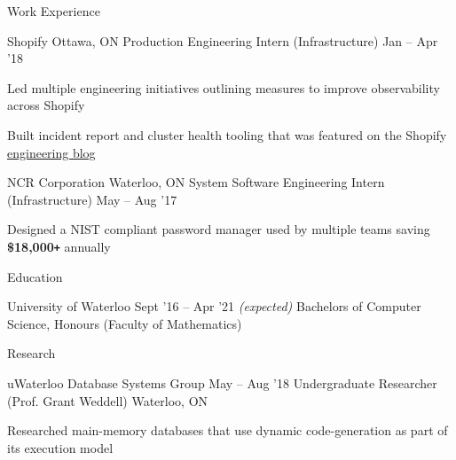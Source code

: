 \documentclass{resume} %
\begin{document}
\begin{rSection}{Work Experience}
  \begin{rWorkSection}{Shopify}
		     {Ottawa, ON}
		     {Production Engineering Intern (Infrastructure)}
		     {Jan -- Apr '18}
    {
      \item Led multiple engineering initiatives outlining measures to improve
        observability across Shopify
      \item Built incident report and cluster health tooling that was featured on the Shopify 
        \href{https://engineering.shopify.com/blogs/engineering/implementing-chatops-into-our-incident-management-procedure}
        {\underline{engineering blog}}
    }
  \end{rWorkSection}

  \begin{rWorkSection}{NCR Corporation}
		     {Waterloo, ON}
		     {System Software Engineering Intern (Infrastructure)}
		     {May -- Aug '17}
    {
      \item Designed a NIST compliant password manager used by multiple teams
        saving \textbf{\$18,000\texttt{+}}
        annually
    }
  \end{rWorkSection}
\end{rSection} 


\begin{rSection}{Education}
  \begin{rEducationSection}{University of Waterloo}
		     {Sept '16 -- Apr '21 \em (expected)}
		     {Bachelors of Computer Science, Honours (Faculty of Mathematics)}
  \end{rEducationSection}
\end{rSection} 


\begin{rSection}{Research}
  \begin{rSubsection}{uWaterloo Database Systems Group}
	  {May -- Aug '18}
    {Undergraduate Researcher (Prof. Grant Weddell)}
	  {Waterloo, ON}
    \item Researched main-memory databases that use dynamic
      code-generation as part of its execution model
  \end{rSubsection}
\end{rSection}
\end{document}
